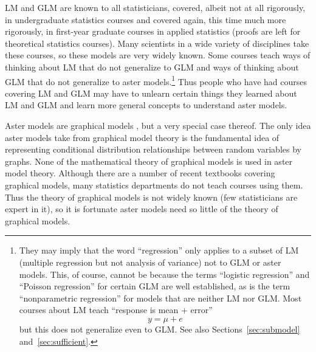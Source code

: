 \documentclass[11pt]{article}
\begin{document}
LM and GLM are known to all statisticians,
covered, albeit not at all rigorously, in undergraduate statistics courses
and covered again, this time much more rigorously,
in first-year graduate courses in applied statistics (proofs
are left for theoretical statistics courses).  Many scientists
in a wide variety of disciplines take these courses, so these models
are very widely known.  Some courses teach ways of thinking about LM
that do not generalize to GLM and ways of thinking about GLM
that do not generalize to aster models.\footnote{They may imply that
the word ``regression'' only applies to a subset of LM (multiple regression but
not analysis of variance) not to GLM or aster models.  This, of course, cannot
be because the terms ``logistic regression'' and ``Poisson regression'' for
certain GLM are well established, as is the term ``nonparametric regression''
for models that are neither LM nor GLM.
Most courses about LM teach ``response is mean + error''
$$
   y = \mu + e
$$
but this does not generalize even to GLM.  See also Sections~\ref{sec:submodel}
and~\ref{sec:sufficient}.}  Thus people who have had courses covering
LM and GLM may have to unlearn certain things they learned about LM and GLM
and learn more general concepts to understand aster models.

Aster models are graphical models \citep{lauritzen}, but
a very special case thereof.  The only idea aster models take from graphical
model theory is the fundamental idea of representing conditional distribution
relationships between random variables by graphs.  None of the mathematical
theory of graphical models is used in aster model theory.  Although there
are a number of recent textbooks covering graphical models, many statistics
departments do not teach courses using them.  Thus the theory of graphical
models is not widely known (few statisticians are expert in it),
so it is fortunate aster models need so little of the theory
of graphical models.
\end{document}
